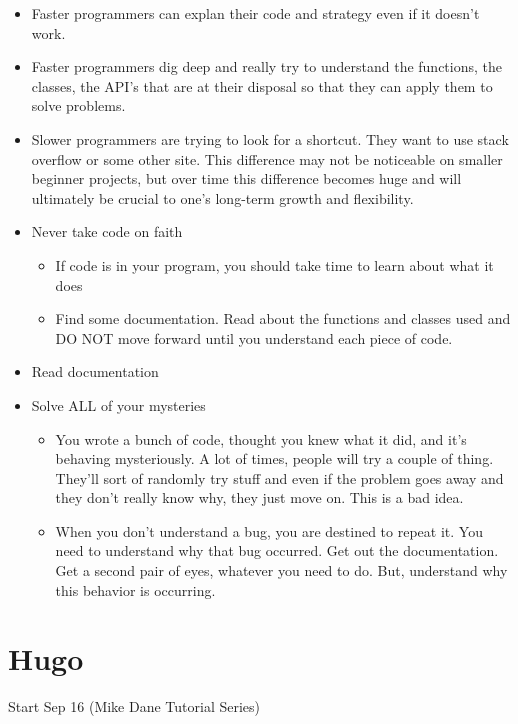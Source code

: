 \begin{itemize}
\item
	Faster programmers can explan their code and strategy even if it  doesn't work.
\item
	Faster programmers dig deep and really try to understand the functions, the classes, the API's that are at their disposal so that they can apply them to solve problems.
\item
	Slower programmers are trying to look for a shortcut. They want to use stack overflow or some other site. This difference may not be noticeable on smaller beginner projects, but over time this difference becomes huge and will ultimately be crucial to one's long-term growth and flexibility.
\item
	Never take code on faith

	\begin{itemize}
	\item
		If code is in your program, you should take time to learn about what it does
	\item
		Find some documentation. Read about the functions and classes used and DO NOT move forward until you understand each piece of code.
	\end{itemize}
\item
	Read documentation
\item
	Solve ALL of your mysteries
	\begin{itemize}
	\item
		You wrote a bunch of code, thought you knew what it did, and it's behaving mysteriously. A lot of times, people will try a couple of thing. They'll sort of randomly try stuff and even if the problem goes away and they don't really know why, they just move on. This is a bad idea.
	\item
		When you don't understand a bug, you are destined to repeat it. You need to understand why that bug occurred. Get out the documentation. Get a second pair of eyes, whatever you need to do. But, understand why this behavior is occurring.
	\end{itemize}
\end{itemize}




\section{Hugo}

Start Sep 16 (Mike Dane Tutorial Series)

